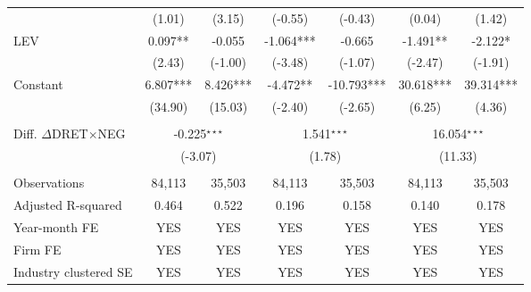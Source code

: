 \begin{table}[htbp]
\begin{tabular}{lcccccc}
      & (1.01) & \multicolumn{1}{c}{(3.15)} & (-0.55) & \multicolumn{1}{c}{(-0.43)} & (0.04) & \multicolumn{1}{c}{(1.42)} \\
    LEV & 0.097** & \multicolumn{1}{c}{-0.055} & -1.064*** & \multicolumn{1}{c}{-0.665} & -1.491** & \multicolumn{1}{c}{-2.122*} \\
      & (2.43) & \multicolumn{1}{c}{(-1.00)} & (-3.48) & \multicolumn{1}{c}{(-1.07)} & (-2.47) & \multicolumn{1}{c}{(-1.91)} \\
    Constant & 6.807*** & \multicolumn{1}{c}{8.426***} & -4.472** & \multicolumn{1}{c}{-10.793***} & 30.618*** & \multicolumn{1}{c}{39.314***} \\
      & (34.90) & \multicolumn{1}{c}{(15.03)} & (-2.40) & \multicolumn{1}{c}{(-2.65)} & (6.25) & \multicolumn{1}{c}{(4.36)} \\
      &   & \multicolumn{1}{c}{} &   & \multicolumn{1}{c}{} &   & \multicolumn{1}{c}{} \\
    \rowcolor[rgb]{ .933,  .925,  .882} Diff. $\Delta$DRET$\times$NEG & \multicolumn{2}{c}{ -0.225$^{\star\star\star}$} & \multicolumn{2}{c}{1.541$^{\star\star\star}$} & \multicolumn{2}{c}{16.054$^{\star\star\star}$} \\
    \rowcolor[rgb]{ .933,  .925,  .882} & \multicolumn{2}{c}{(-3.07)} & \multicolumn{2}{c}{ (1.78)} & \multicolumn{2}{c}{(11.33)} \\
    &&&&&&\\
    Observations & 84,113 & \multicolumn{1}{c}{35,503} & 84,113 & \multicolumn{1}{c}{35,503} & 84,113 & \multicolumn{1}{c}{35,503} \\
    Adjusted R-squared & 0.464 & \multicolumn{1}{c}{0.522} & 0.196 & \multicolumn{1}{c}{0.158} & 0.140 & \multicolumn{1}{c}{0.178} \\
    Year-month FE & YES & \multicolumn{1}{c}{YES} & YES & \multicolumn{1}{c}{YES} & YES & \multicolumn{1}{c}{YES} \\
    Firm FE & YES & \multicolumn{1}{c}{YES} & YES & \multicolumn{1}{c}{YES} & YES & \multicolumn{1}{c}{YES} \\
    Industry clustered SE & YES & \multicolumn{1}{c}{YES} & YES & \multicolumn{1}{c}{YES} & YES & \multicolumn{1}{c}{YES} \\
    \bottomrule
    \bottomrule
    \end{tabular}%
\end{table}%
